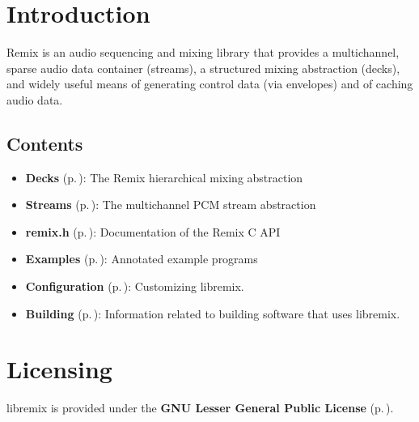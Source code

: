 \section{Introduction}\label{Introduction}
Remix is an audio sequencing and mixing library that provides a multichannel, sparse audio data container (streams), a structured mixing abstraction (decks), and widely useful means of generating control data (via envelopes) and of caching audio data.\subsection{Contents}\label{contents}
\begin{itemize}
\item {\bf Decks }{\rm (p.\,\pageref{remix__deck_8h})}: The Remix hierarchical mixing abstraction\end{itemize}


\begin{itemize}
\item {\bf Streams }{\rm (p.\,\pageref{remix__stream_8h})}: The multichannel PCM stream abstraction\end{itemize}


\begin{itemize}
\item {\bf remix.h }{\rm (p.\,\pageref{remix_8h})}: Documentation of the Remix C API\end{itemize}


\begin{itemize}
\item {\bf Examples }{\rm (p.\,\pageref{group__examples})}: Annotated example programs\end{itemize}


\begin{itemize}
\item {\bf Configuration }{\rm (p.\,\pageref{group__configuration})}: Customizing libremix.\end{itemize}


\begin{itemize}
\item {\bf Building }{\rm (p.\,\pageref{group__building})}: Information related to building software that uses libremix.\end{itemize}
\section{Licensing}\label{licensing}
libremix is provided under the {\bf GNU Lesser General Public License }{\rm (p.\,\pageref{group__lgpl})}. 